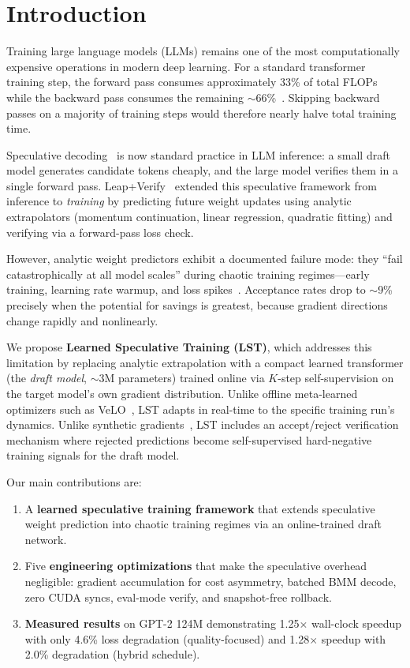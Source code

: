 \documentclass[conference]{IEEEtran}
\begin{document}
\section{Introduction}

Training large language models (LLMs) remains one of the most computationally expensive operations in modern deep learning. For a standard transformer training step, the forward pass consumes approximately 33\% of total FLOPs while the backward pass consumes the remaining $\sim$66\%~\cite{kaplan2020scaling}. Skipping backward passes on a majority of training steps would therefore nearly halve total training time.

Speculative decoding~\cite{leviathan2023fast, chen2023accelerating} is now standard practice in LLM inference: a small draft model generates candidate tokens cheaply, and the large model verifies them in a single forward pass. Leap+Verify~\cite{leapverify2026} extended this speculative framework from inference to \emph{training} by predicting future weight updates using analytic extrapolators (momentum continuation, linear regression, quadratic fitting) and verifying via a forward-pass loss check.

However, analytic weight predictors exhibit a documented failure mode: they ``fail catastrophically at all model scales'' during chaotic training regimes---early training, learning rate warmup, and loss spikes~\cite{leapverify2026}. Acceptance rates drop to $\sim$9\% precisely when the potential for savings is greatest, because gradient directions change rapidly and nonlinearly.

We propose \textbf{Learned Speculative Training (LST)}, which addresses this limitation by replacing analytic extrapolation with a compact learned transformer (the \emph{draft model}, $\sim$3M parameters) trained online via $K$-step self-supervision on the target model's own gradient distribution. Unlike offline meta-learned optimizers such as VeLO~\cite{metz2022velo}, LST adapts in real-time to the specific training run's dynamics. Unlike synthetic gradients~\cite{jaderberg2017decoupled}, LST includes an accept/reject verification mechanism where rejected predictions become self-supervised hard-negative training signals for the draft model.

Our main contributions are:
\begin{enumerate}
    \item A \textbf{learned speculative training framework} that extends speculative weight prediction into chaotic training regimes via an online-trained draft network.
    \item Five \textbf{engineering optimizations} that make the speculative overhead negligible: gradient accumulation for cost asymmetry, batched BMM decode, zero CUDA syncs, eval-mode verify, and snapshot-free rollback.
    \item \textbf{Measured results} on GPT-2 124M demonstrating 1.25$\times$ wall-clock speedup with only 4.6\% loss degradation (quality-focused) and 1.28$\times$ speedup with 2.0\% degradation (hybrid schedule).
\end{enumerate}
\end{document}
